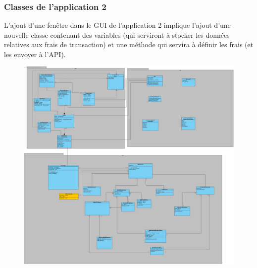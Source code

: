 \documentclass[../rapport.tex]{subfiles}
\begin{document}
\subsubsection{Classes de l'application 2}
L'ajout d'une fenêtre dans le GUI de l'application 2 implique l'ajout d'une nouvelle classe contenant des variables (qui serviront à stocker les données relatives aux frais de transaction) et une méthode qui servira à définir les frais (et les envoyer à l'API).
\begin{figure}[H]
    \includegraphics[scale=0.148]{ressources/photos_diagrammes/extensionUgo/classDiagramApp2.jpg}
\end{figure}
\end{document}
